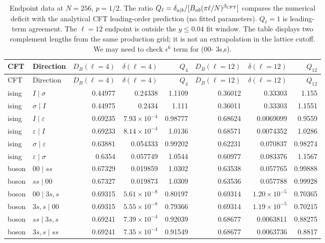 \begin{longtable}{llrrrrrr}
\caption{Endpoint data at $N=256$, $p=1/2$. The ratio $Q_\ell=\delta_{a\mid b}/[B_{ab}(\pi\ell/N)^{\beta_{\rm CFT}}]$ compares the numerical deficit with the analytical CFT leading-order prediction (no fitted parameters). $Q_\ell=1$ is leading-term agreement. The $\ell=12$ endpoint is outside the $y\leq0.04$ fit window. The table displays two complement lengths from the same production grid; it is not an extrapolation in the lattice cutoff. We may need to check $\epsilon^6$ term for (00- 3s,s).}
\label{tab:complement-endpoint}\\\toprule
CFT & Direction & $D_B(\ell=4)$ & $\delta(\ell=4)$ & $Q_4$ & $D_B(\ell=12)$ & $\delta(\ell=12)$ & $Q_{12}$\\\midrule\endfirsthead
\toprule
CFT & Direction & $D_B(\ell=4)$ & $\delta(\ell=4)$ & $Q_4$ & $D_B(\ell=12)$ & $\delta(\ell=12)$ & $Q_{12}$\\\midrule\endhead
\bottomrule\endfoot
ising & $I\mid \sigma$ & 0.44977 & 0.24338 & 1.1109 & 0.36012 & 0.33303 & 1.155\\
ising & $\sigma\mid I$ & 0.44975 & 0.2434 & 1.111 & 0.36011 & 0.33303 & 1.1551\\
ising & $I\mid \varepsilon$ & 0.69235 & $7.93\!\times\!10^{-4}$ & 0.98777 & 0.68624 & 0.0069099 & 0.9559\\
ising & $\varepsilon\mid I$ & 0.69233 & $8.14\!\times\!10^{-4}$ & 1.0136 & 0.68571 & 0.0074352 & 1.0286\\
ising & $\sigma\mid \varepsilon$ & 0.63881 & 0.054333 & 0.99202 & 0.62231 & 0.070837 & 0.98274\\
ising & $\varepsilon\mid \sigma$ & 0.6354 & 0.057749 & 1.0544 & 0.60977 & 0.083376 & 1.1567\\
boson & $00\mid ss$ & 0.67329 & 0.019859 & 1.0302 & 0.63538 & 0.057765 & 0.99888\\
boson & $ss\mid 00$ & 0.67327 & 0.019873 & 1.0309 & 0.63536 & 0.057788 & 0.99928\\
boson & $00\mid 3s,s$ & 0.69315 & $5.61\!\times\!10^{-8}$ & 0.80197 & 0.69314 & $1.20\!\times\!10^{-5}$ & 0.70365\\
boson & $3s,s\mid 00$ & 0.69315 & $5.55\!\times\!10^{-8}$ & 0.79366 & 0.69314 & $1.19\!\times\!10^{-5}$ & 0.70215\\
boson & $ss\mid 3s,s$ & 0.69241 & $7.39\!\times\!10^{-4}$ & 0.92039 & 0.68677 & 0.0063811 & 0.88275\\
boson & $3s,s\mid ss$ & 0.69241 & $7.35\!\times\!10^{-4}$ & 0.91549 & 0.68677 & 0.0063736 & 0.8817\\
\end{longtable}
